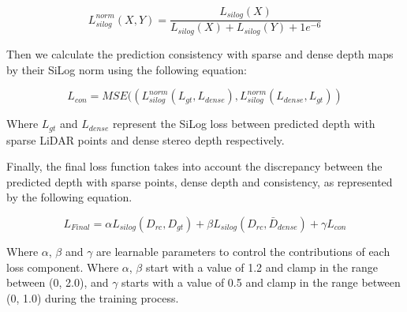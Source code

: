 \documentclass{article}
\begin{document}
\begin{equation}
    L_{silog}^{norm}(X, Y) = \frac{L_{silog}(X)}{L_{silog}(X) + L_{silog}(Y) + 1e^{-6}}
\end{equation}

Then we calculate the prediction consistency with sparse and dense depth maps by their SiLog norm using the following equation:

\begin{equation}
    L_{con} = MSE((L_{silog}^{norm}(L_{gt}, L_{dense}) 
    , L_{silog}^{norm}(L_{dense}, L_{gt}))
\end{equation}

Where \(L_{gt}\) and \(L_{dense}\) represent the SiLog loss between predicted depth with sparse LiDAR points and dense stereo depth respectively. 

Finally, the final loss function takes into account the discrepancy between the predicted depth with sparse points, dense depth and consistency, as represented by the following equation.

\begin{equation}
    L_{Final} = \alpha L_{silog}(D_{rc}, D_{gt}) + \beta  L_{silog}(D_{rc}, \bar{D}_{dense}) + \gamma L_{con}
\end{equation}

Where \(\alpha\), \(\beta\) and \(\gamma\) are learnable parameters to control the contributions of each loss component. Where \(\alpha\), \(\beta\) start with a value of 1.2 and clamp in the range between (0, 2.0), and \(\gamma\) starts with a value of 0.5 and clamp in the range between (0, 1.0) during the training process.
\end{document}
